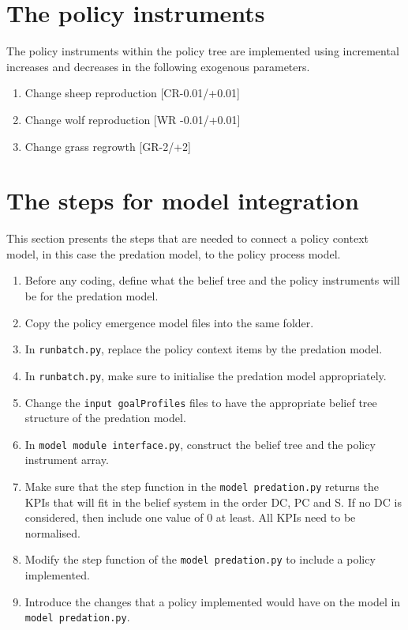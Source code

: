 \documentclass[12pt]{article}
\begin{document}
\section{The policy instruments}
\label{sec:interfaceInstruments}

The policy instruments within the policy tree are implemented using incremental increases and decreases in the following exogenous parameters.

\begin{enumerate}
\item Change sheep reproduction [CR-0.01/+0.01]
\item Change wolf reproduction [WR -0.01/+0.01]
\item Change grass regrowth [GR-2/+2]
\end{enumerate}



\section{The steps for model integration}
\label{sec:steps}

This section presents the steps that are needed to connect a policy context model, in this case the predation model, to the policy process model.

\begin{enumerate}
\item Before any coding, define what the belief tree and the policy instruments will be for the predation model.
\item Copy the policy emergence model files into the same folder.
\item In \texttt{runbatch.py}, replace the policy context items by the predation model.
\item In \texttt{runbatch.py}, make sure to initialise the predation model appropriately.
\item Change the \texttt{input goalProfiles} files to have the appropriate belief tree structure of the predation model.
\item In \texttt{model module interface.py}, construct the belief tree and the policy instrument array.
\item Make sure that the step function in the \texttt{model predation.py} returns the KPIs that will fit in the belief system in the order DC, PC and S. If no DC is considered, then include one value of 0 at least. All KPIs need to be normalised.
\item Modify the step function of the \texttt{model predation.py} to include a policy implemented.
\item Introduce the changes that a policy implemented would have on the model in \texttt{model predation.py}.
\end{enumerate}
\end{document}
